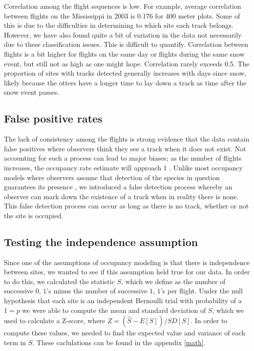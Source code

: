 \documentclass[12pt]{article}
\begin{document}
    Correlation among the flight sequences is low. For example, average
    correlation between flights on the Mississippi in 2003 is 0.176 for 400
    meter plots. Some of this is due to the difficulties in determining to which
    site each track belongs. However, we have also found quite a bit of
    variation in the data not necessarily due to these classification issues.
    This is difficult to quantify. Correlation between flights is a bit higher 
    for
    flights on the same day or flights during the same snow event, but still not
    as high as one might hope. Correlation rarely exceeds 0.5. The proportion of 
    sites with tracks detected
    generally increases with days since snow, likely because the otters have a
    longer time to lay down a track as time after the snow event passes.

    \subsection{False positive rates}
    The lack of consistency among the flights is strong evidence that the data
    contain false positives where observers think they see a track when it does
    not exist. Not accounting for such a process can lead to major biases; as
    the number of flights increases, the occupancy rate estimate will approach
    1 \cite{Royle2006}. Unlike most occupancy models where observers assume 
    that detection of the species in question guarantees its presence \cite
    {MacKenzie2006}, we introduced a false detection process whereby an observer 
    can mark down the existence of a track when in reality there is none. This 
    false detection process can occur as long as there is no track, whether or 
    not the site is occupied.

    \subsection{Testing the independence assumption}
    \label{shat}
    Since one of the assumptions of occupancy modeling is that there is 
	independence between sites, we wanted to see if this assumption held true 
	for our data.  In order to do this, we calculated the statistic \(S\), which
	we define as the number of successive \(0\), \(1\)'s minus the number of
    successive \(1\), \(1\)'s per flight. Under the null hypothesis that each
    site is an independent Bernoulli trial with probability of a \(1 = p\) we were able
    to compute the mean and standard deviation of \(S\), which we used to
    calculate a Z-score, where \(Z = (\hat{S} - E[S])/SD[S]\). In order to compute these values, we needed to find the
    expected value and variance of each term in \(S\). These caclulations can be
	found in the appendix \ref{math}.  
\end{document}
